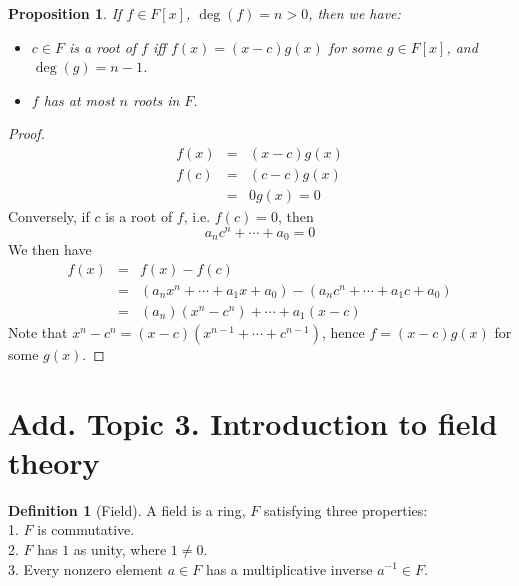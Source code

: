 \documentclass{article}
\theoremstyle{MyNonumberplain}
\theoremstyle{break}
\newtheorem*{proof}{Proof. }
\theoremstyle{break}
\newtheorem{proposition}{Proposition}[section]
\theoremstyle{break}
\theoremstyle{definition}
\theoremstyle{break}
\newtheorem{definition}{Definition}[section]
\begin{document}
\begin{thmbox}
    \begin{proposition}
        If $f \in F [x]$, $\deg (f) = n > 0$, then we have:\\
        \begin{itemize}
          \item $c \in F$ is a root of $f$ iff $f (x) = (x - c) g (x)$ for some $g \in
          F [x]$, and $\deg (g) = n - 1$.\\
          
          \item $f$ has at most $n$ roots in $F$. 
        \end{itemize}
    \end{proposition}
    \begin{prfbox}
        \begin{proof}
            \begin{eqnarray*}
                f (x) & = & (x - c) g (x)\\
                f (c) & = & (c - c) g (x)\\
                & = & 0 g (x) = 0
              \end{eqnarray*}
              Conversely, if $c$ is a root of $f$, i.e. $f (c) = 0$, then
              \[ a_n c^n + \cdots + a_0 = 0 \]
              We then have
              \begin{eqnarray*}
                f (x) & = & f (x) - f (c)\\
                & = & (a_n x^n + \cdots + a_1 x + a_0) - (a_n c^n + \cdots + a_1 c + a_0)\\
                & = & (a_n) (x^n - c^n) + \cdots + a_1 (x - c)
              \end{eqnarray*}
              Note that $x^n - c^n = (x - c) (x^{n - 1} + \cdots + c^{n - 1})$, hence $f =
              (x - c) g (x)$ for some $g (x)$.
        \end{proof}
    \end{prfbox}
\end{thmbox}

\newpage

\section{Add. Topic 3. Introduction to field theory}

\begin{defbox}
    \begin{definition}[Field]
        A field is a ring, $F$ satisfying three properties:\\
    
        1. $F$ is commutative.\\
        
        2. $F$ has $1$ as unity, where $1 \neq 0$.\\
        
        3. Every nonzero element $a \in F$ has a multiplicative inverse $a^{- 1} \in
        F$. 
    \end{definition}
\end{defbox}
\end{document}
